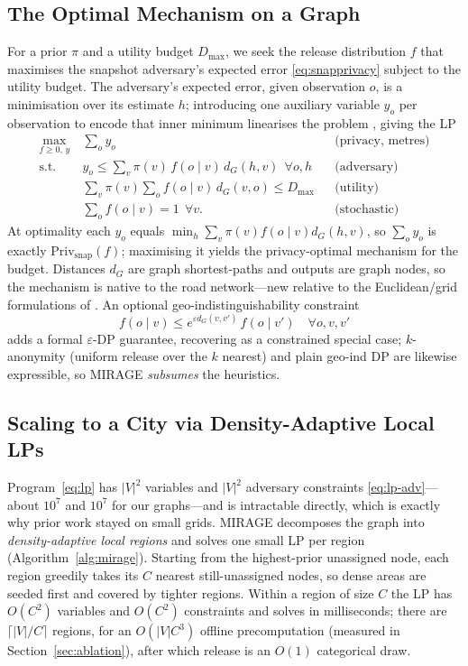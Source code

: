 \documentclass[11pt]{article}
\newcommand{\dG}{d_{G}}
\begin{document}
\subsection{The Optimal Mechanism on a Graph}
For a prior $\pi$ and a utility budget $D_{\max}$, we seek the release
distribution $f$ that maximises the snapshot adversary's expected error
\eqref{eq:snapprivacy} subject to the utility budget. The adversary's expected
error, given observation $o$, is a minimisation over its estimate $h$; introducing
one auxiliary variable $y_o$ per observation to encode that inner minimum
linearises the problem \cite{shokri2012}, giving the LP
\begin{subequations}\label{eq:lp}
\begin{align}
\max_{f\ge 0,\,y}\ & \sum_{o} y_o &&\text{(privacy, metres)}\\
\text{s.t. }\ & y_o \le \sum_{v}\pi(v)\,f(o\mid v)\,\dG(h,v)\ \ \forall o,h &&\text{(adversary)}\label{eq:lp-adv}\\
& \sum_{v}\pi(v)\sum_{o} f(o\mid v)\,\dG(v,o)\le D_{\max} &&\text{(utility)}\\
& \sum_{o} f(o\mid v)=1\ \ \forall v. &&\text{(stochastic)}
\end{align}
\end{subequations}
At optimality each $y_o$ equals $\min_h\sum_v \pi(v)f(o\mid v)\dG(h,v)$, so
$\sum_o y_o$ is exactly $\mathrm{Priv}_{\mathrm{snap}}(f)$; maximising it yields
the privacy-optimal mechanism for the budget. Distances $\dG$ are graph
shortest-paths and outputs are graph nodes, so the mechanism is native to the road
network---new relative to the Euclidean/grid formulations of
\cite{shokri2012,bordenabe2014}. An optional geo-indistinguishability constraint
\begin{equation}
f(o\mid v)\le e^{\varepsilon \dG(v,v')}\,f(o\mid v')\quad\forall o,v,v'
\label{eq:geoind}
\end{equation}
adds a formal $\varepsilon$-DP guarantee, recovering \cite{bordenabe2014} as a
constrained special case; $k$-anonymity (uniform release over the $k$ nearest) and
plain geo-ind DP are likewise expressible, so MIRAGE \emph{subsumes} the
heuristics.

\subsection{Scaling to a City via Density-Adaptive Local LPs}
Program~\eqref{eq:lp} has $|V|^2$ variables and $|V|^2$ adversary constraints
\eqref{eq:lp-adv}---about $10^7$ and $10^7$ for our graphs---and is intractable
directly, which is exactly why prior work stayed on small grids. MIRAGE
decomposes the graph into \emph{density-adaptive local regions} and solves one
small LP per region (Algorithm~\ref{alg:mirage}). Starting from the highest-prior
unassigned node, each region greedily takes its $C$ nearest still-unassigned
nodes, so dense areas are seeded first and covered by tighter regions. Within a
region of size $C$ the LP has $O(C^2)$ variables and $O(C^2)$ constraints and
solves in milliseconds; there are $\lceil|V|/C\rceil$ regions, for an
$O(|V|C^3)$ offline precomputation (measured in Section~\ref{sec:ablation}), after
which release is an $O(1)$ categorical draw.
\end{document}
